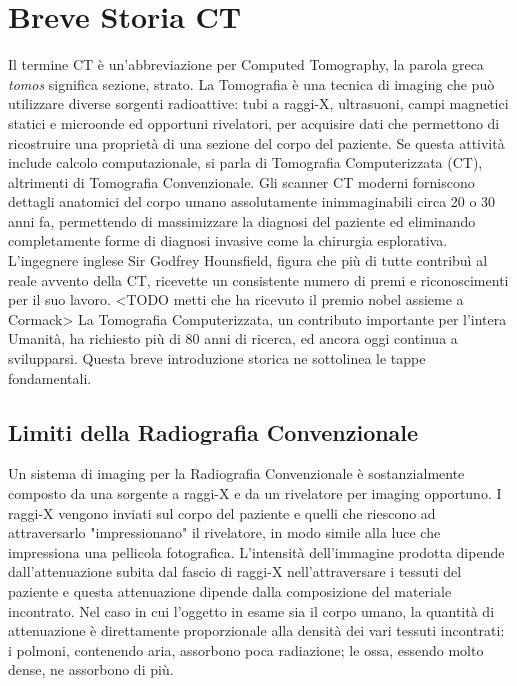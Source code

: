 \documentclass[a4paper,12pt, doubleside]{report}
\begin{document}
        \section{Breve Storia CT}
            \par
                Il termine CT è un'abbreviazione per Computed Tomography, la parola greca \textit{tomos} significa sezione, strato. La Tomografia è una tecnica di imaging che può utilizzare diverse sorgenti radioattive: tubi a raggi-X, ultrasuoni, campi magnetici statici e microonde ed opportuni rivelatori, per acquisire dati che permettono di ricostruire una proprietà di una sezione del corpo del paziente. Se questa attività include calcolo computazionale, si parla di Tomografia Computerizzata (CT), altrimenti di Tomografia Convenzionale. Gli scanner CT moderni forniscono dettagli anatomici del corpo umano assolutamente inimmaginabili circa 20 o 30 anni fa, permettendo di massimizzare la diagnosi del paziente ed eliminando completamente forme di diagnosi invasive come la chirurgia esplorativa. L'ingegnere inglese Sir Godfrey Hounsfield, figura che più di tutte contribuì al reale avvento della CT, ricevette un consistente numero di premi e riconoscimenti per il suo lavoro. <TODO metti che ha ricevuto il premio nobel assieme a Cormack> La Tomografia Computerizzata, un contributo importante per l'intera Umanità, ha richiesto più di 80 anni di ricerca, ed ancora oggi continua a svilupparsi. Questa breve introduzione storica ne sottolinea le tappe fondamentali.
            
            \subsection{Limiti della Radiografia Convenzionale}
                \par
                    Un sistema di imaging per la Radiografia Convenzionale è sostanzialmente composto da una sorgente a raggi-X e da un rivelatore per imaging opportuno. I raggi-X vengono inviati sul corpo del paziente e quelli che riescono ad attraversarlo "impressionano" il rivelatore, in modo simile alla luce che impressiona una pellicola fotografica. L'intensità dell'immagine prodotta dipende dall'attenuazione subita dal fascio di raggi-X nell'attraversare i tessuti del paziente e questa attenuazione dipende dalla composizione del materiale incontrato. Nel caso in cui l’oggetto in esame sia il corpo umano, la quantità di attenuazione è direttamente proporzionale alla densità dei vari tessuti incontrati: i polmoni, contenendo aria, assorbono poca radiazione; le ossa, essendo molto dense, ne assorbono di più.
                            
\end{document}
